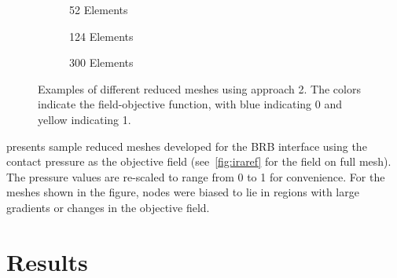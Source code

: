 \documentclass[10pt,print]{article}
\begin{document}
\begin{figure}[!h]
  \centering
  \begin{subfigure}{0.5\linewidth}
    \centering
    \caption{52 Elements}
  \end{subfigure}%
  \begin{subfigure}{0.5\linewidth}
    \centering
    \caption{124 Elements}
  \end{subfigure}
  
  \begin{subfigure}{0.5\linewidth}
    \centering
    \caption{300 Elements}
  \end{subfigure}
  \caption{Examples of different reduced meshes using approach 2. The
    colors indicate the field-objective function, with blue indicating
    0 and yellow indicating 1.}
  \label{fig:ira}
\end{figure}
\vspace{-0.2cm}
 presents sample reduced meshes developed for the BRB
interface using the contact pressure as the objective field 
(see~\cref{fig:iraref} for the field on full mesh). The pressure
values are re-scaled to range from 0 to 1 for convenience. For the
meshes shown in the figure, nodes were biased to lie in regions with
large gradients or changes in the objective field.

\section{Results}
\label{sec:results}
\end{document}
